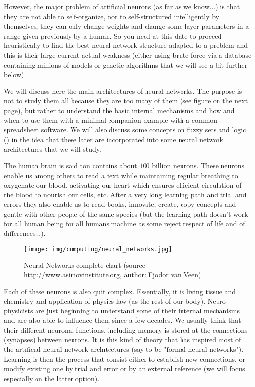 	However, the major problem of artificial neurons (as far as we know...) is that they are not able to self-organize, nor to self-structured intelligently by themselves, they can only change weights and change some layer parameters in a range given previously by a human. So you need at this date to proceed heuristically to find the best neural network structure adapted to a problem and this is their large current actual weakness (either using brute force via a database containing millions of models or genetic algorithms that we will see a bit further below).
	
	We will discuss here the main architectures of neural networks. The purpose is not to study them all because they are too many of them (see figure on the next page), but rather to understand the basic internal mechanisms and how and when to use them with a minimal companion example with a common spreadsheet software. We will also discuss some concepts on fuzzy sets and logic () in the idea that these later are incorporated into some neural network architectures that we will study.
	
	The human brain is said ton contains about $100$ billion neurons. These neurons enable us among others to read a text while maintaining regular breathing to oxygenate our blood, activating our heart which ensures efficient circulation of the blood to nourish our cells, etc. After a very long learning path and trial and errors they also enable us to read books, innovate, create, copy concepts and gentle with other people of the same species (but the learning path doesn't work for all human being for all humans machine as some reject respect of life and of differences...).
	\begin{figure}[H]
		\centering
	  	\texttt{[image: img/computing/neural\_networks.jpg]}
		\caption[Neural Networks complete chart]{Neural Networks complete chart (source: http://www.asimovinstitute.org, author: Fjodor van Veen)}
	\end{figure}
	Each of these neurons is also quit complex. Essentially, it is living tissue and chemistry and application of physics law (as the rest of our body). Neuro-physicists are just beginning to understand some of their internal mechanisms and are also able to influence them since a few decades. We usually think that their different neuronal functions, including memory is stored at the connections (synapses) between neurons. It is this kind of theory that has inspired most of the artificial neural network architectures (say to be "formal neural networks"). Learning is then the process that consist either to establish new connections, or modify existing one by trial and error or by an external reference (we will focus especially on the latter option).
	
